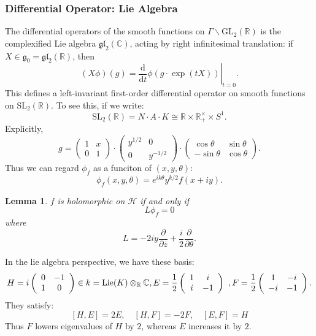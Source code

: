 \documentclass[11pt,english]{smfart}
\newtheorem{lemma}{Lemma}[section]
\theoremstyle{definition}
\theoremstyle{remark}
\renewcommand{\bar}{\overline}
\begin{document}
\subsubsection{Differential Operator: Lie Algebra}
The differential operators of the smooth functions on $ \Gamma \backslash \mathrm{GL}_{2}(\mathbb{R}) $ is the complexified Lie algebra $ \mathfrak{g l}_{2}(\mathbb{C}) $,
acting by right infinitesimal translation: if $ X \in \mathfrak{g}_{0}=\mathfrak{gl}_{2}(\mathbb{R}) $, then
\[(X \phi)(g)=\left.\frac{\mathrm{d}}{\mathrm{d}t} \phi(g \cdot \exp (t X))\right|_{t=0} .\]
This defines a left-invariant first-order differential operator on smooth functions on $ \mathrm{SL}_{2}(\mathbb{R}) $. To see this, if we write:
\[\mathrm{SL}_{2}(\mathbb{R})=N \cdot A \cdot K \cong \mathbb{R} \times \mathbb{R}_{+}^{\times} \times S^{1} .\]
Explicitly,
\[g=\left(\begin{array}{ll}
1 & x \\
0 & 1
\end{array}\right) \cdot\left(\begin{array}{cc}
y^{1 / 2} & 0 \\
0 & y^{-1 / 2}
\end{array}\right) \cdot\left(\begin{array}{cc}
\cos \theta & \sin \theta \\
-\sin \theta & \cos \theta
\end{array}\right) .\]
Thus we can regard $ \phi_{f} $ as a funciton of $ (x, y, \theta)  $:
\[\phi_{f}(x, y, \theta)=e^{i k \theta} y^{k / 2} f(x+i y) .\]
\begin{lemma}
$f $ is holomorphic on $ \mathcal{H} $ if and only if
\[L \phi_{f}=0\]
where
\[L=-2 i y \frac{\partial}{\partial \bar{z}}+\frac{i}{2} \frac{\partial}{\partial \theta} . \]    
\end{lemma}
In the lie algebra perspective, we have these basis:
\[H=i \left(\begin{array}{cc}
0 & -1 \\
1 & 0
\end{array}\right) \in \mathfrak{k}=\operatorname{Lie}(K) \otimes_{\mathbb{R}} \mathbb{C}, \\
E=\frac{1}{2} \left(\begin{array}{cc}
1 & i \\
i & -1
\end{array}\right) \ , F=\frac{1}{2} \left(\begin{array}{cc}
1 & -i \\
-i & -1
\end{array}\right) .
\]
They satisfy:
\[[H, E]=2 E, \quad[H, F]=-2 F, \quad[E, F]=H\]
Thus $ F $ lowers eigenvalues of $ H $ by $2 $, whereas $ E $ increases it by $2 $.
\end{document}
